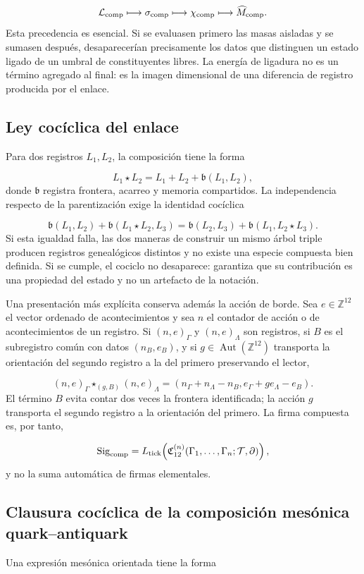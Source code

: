 \[
\mathcal L_{\rm comp}
\longmapsto \sigma_{\rm comp}
\longmapsto \chi_{\rm comp}
\longmapsto \widehat M_{\rm comp}.
\]
Esta precedencia es esencial. Si se evaluasen primero las masas aisladas y se sumasen después, desaparecerían precisamente los datos que distinguen un estado ligado de un umbral de constituyentes libres. La energía de ligadura no es un término agregado al final: es la imagen dimensional de una diferencia de registro producida por el enlace.

\subsection{Ley cocíclica del enlace}
Para dos registros \(L_1,L_2\), la composición tiene la forma

\[
L_1\star L_2
=L_1+L_2+\mathfrak b(L_1,L_2),
\]
donde \(\mathfrak b\) registra frontera, acarreo y memoria compartidos. La independencia respecto de la parentización exige la identidad cocíclica

\[
\mathfrak b(L_1,L_2)
+\mathfrak b(L_1\star L_2,L_3)
=
\mathfrak b(L_2,L_3)
+\mathfrak b(L_1,L_2\star L_3).
\]
Si esta igualdad falla, las dos maneras de construir un mismo árbol triple producen registros genealógicos distintos y no existe una especie compuesta bien definida. Si se cumple, el cociclo no desaparece: garantiza que su contribución es una propiedad del estado y no un artefacto de la notación.

Una presentación más explícita conserva además la acción de borde. Sea \(e\in\mathbb Z^{12}\) el vector ordenado de acontecimientos y sea \(n\) el contador de acción o de acontecimientos de un registro. Si \((n,e)_\Gamma\) y \((n,e)_\Lambda\) son registros, si \(B\) es el subregistro común con datos \((n_B,e_B)\), y si \(g\in\operatorname{Aut}(\mathbb Z^{12})\) transporta la orientación del segundo registro a la del primero preservando el lector,

\[
(n,e)_\Gamma\star_{(g,B)}(n,e)_\Lambda
=
(n_\Gamma+n_\Lambda-n_B,
e_\Gamma+g e_\Lambda-e_B).
\]
El término \(B\) evita contar dos veces la frontera identificada; la acción \(g\) transporta el segundo registro a la orientación del primero. La firma compuesta es, por tanto,

\[
\operatorname{Sig}_{\rm comp}
=L_{\rm tick}\!\left(
\mathfrak C_{12}^{(n)}
(\Gamma_1,\ldots,\Gamma_n;\mathcal T,\partial)
\right),
\]
y no la suma automática de firmas elementales.

\subsection{Clausura cocíclica de la composición mesónica quark–antiquark}
Una expresión mesónica orientada tiene la forma

